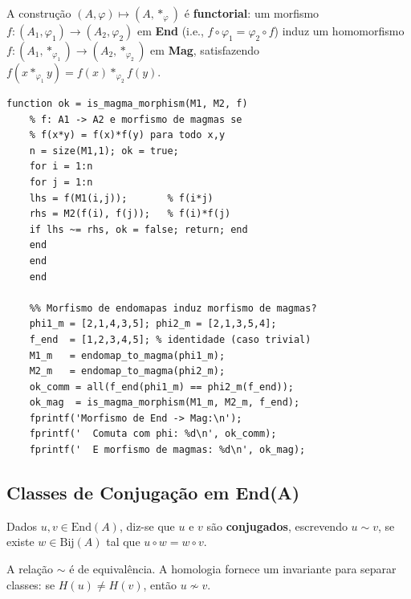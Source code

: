 \begin{proposition}
	A construção $(A, \varphi) \mapsto (A, *_\varphi)$ é
	\textbf{functorial}: um morfismo $f: (A_1, \varphi_1) \to
	(A_2, \varphi_2)$ em \textbf{End}
	(i.e., $f \circ \varphi_1 = \varphi_2 \circ f$) induz um
	homomorfismo $f: (A_1, *_{\varphi_1}) \to (A_2, *_{\varphi_2})$
	em \textbf{Mag}, satisfazendo
	$f(x *_{\varphi_1} y) = f(x) *_{\varphi_2} f(y)$.
\end{proposition}

\begin{lstlisting}[style=matlab, caption={Verificação de functorialidade End -> Mag}]
	function ok = is_magma_morphism(M1, M2, f)
	% f: A1 -> A2 e morfismo de magmas se
	% f(x*y) = f(x)*f(y) para todo x,y
	n = size(M1,1); ok = true;
	for i = 1:n
	for j = 1:n
	lhs = f(M1(i,j));       % f(i*j)
	rhs = M2(f(i), f(j));   % f(i)*f(j)
	if lhs ~= rhs, ok = false; return; end
	end
	end
	end
	
	%% Morfismo de endomapas induz morfismo de magmas?
	phi1_m = [2,1,4,3,5]; phi2_m = [2,1,3,5,4];
	f_end  = [1,2,3,4,5]; % identidade (caso trivial)
	M1_m   = endomap_to_magma(phi1_m);
	M2_m   = endomap_to_magma(phi2_m);
	ok_comm = all(f_end(phi1_m) == phi2_m(f_end));
	ok_mag  = is_magma_morphism(M1_m, M2_m, f_end);
	fprintf('Morfismo de End -> Mag:\n');
	fprintf('  Comuta com phi: %d\n', ok_comm);
	fprintf('  E morfismo de magmas: %d\n', ok_mag);
\end{lstlisting}

\subsection{Classes de Conjugação em End(A)}

\begin{definition}
	Dados $u, v \in \mathrm{End}(A)$, diz-se que $u$ e $v$ são
	\textbf{conjugados}, escrevendo $u \sim v$, se existe
	$w \in \mathrm{Bij}(A)$ tal que $u \circ w = w \circ v$.
\end{definition}

A relação $\sim$ é de equivalência. A homologia fornece um
invariante para separar classes: se $H(u) \neq H(v)$,
então $u \not\sim v$.

